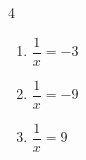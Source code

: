 {\begin{Exercice}
\begin{multicols}{4}
\begin{enumerate}[itemsep=1em]
	\item \begin{minipage}[t]{\linewidth}$\dfrac{1}{x}=-3$\\\end{minipage}
	\item \begin{minipage}[t]{\linewidth}$\dfrac{1}{x}=-9$\\\end{minipage}
	\item \begin{minipage}[t]{\linewidth}$\dfrac{1}{x}=9$\\\end{minipage}
\end{enumerate}
\end{multicols}
\end{Exercice}

}
